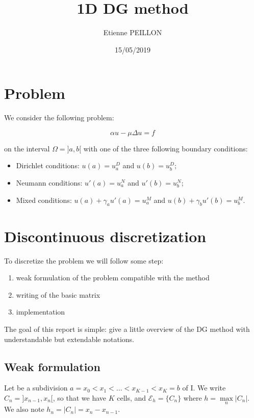\documentclass[a4paper,10pt,draft]{article}
\title{1D DG method}
\author{Etienne PEILLON}
\date{15/05/2019}
\begin{document}
 \maketitle
 
 \section{Problem}
 
 We consider the following problem:
 
 \begin{equation} \label{eq:initial}
  \alpha u - \mu \Delta u = f
 \end{equation}

 on the interval $\Omega = ]a,b[$ with one of the three following boundary conditions:
 \begin{itemize}
  \item Dirichlet conditions: $u(a) = u_a^D$ and $u(b) = u_b^D$;
  \item Neumann conditions: $u'(a) = u_a^N$ and $u'(b) = u_b^N$;
  \item Mixed conditions: $u(a) + \gamma_a u'(a) = u_a^M$ and $u(b) + \gamma_b u'(b) = u_b^M$.
 \end{itemize}

 \section{Discontinuous discretization}
 
 To discretize the problem we will follow some step:
 \begin{enumerate}
  \item weak formulation of the problem compatible with the method
  \item writing of the basic matrix
  \item implementation
 \end{enumerate}
 
 The goal of this report is simple: give a little overview of the DG method with understandable but 
extendable notations.

 \subsection{Weak formulation}
 
 Let be a subdivision $a = x_0 < x_1 < \dots < x_{K-1} < x_K = b$ of I. We write $C_n = 
]x_{n-1},x_n[$, so that we have $K$ cells, and $\mathcal{E}_h = \{ C_n \}$ where $h = \max 
\limits_{n} |C_n|$. We also note $h_n = |C_n| = x_n - x_{n-1}$.
 
\end{document}
